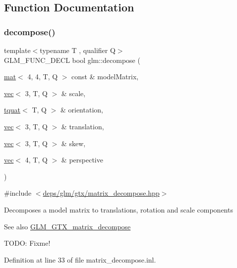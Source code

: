\subsection{Function Documentation}
\mbox{\label{group__gtx__matrix__decompose_ga91185463739c855d602596907a9994bc}} 
\subsubsection{\texorpdfstring{decompose()}{decompose()}}
{\footnotesize\ttfamily template$<$typename T , qualifier Q$>$ \\
G\+L\+M\+\_\+\+F\+U\+N\+C\+\_\+\+D\+E\+CL bool glm\+::decompose (\begin{DoxyParamCaption}\item[{\hyperlink{structglm_1_1mat}{mat}$<$ 4, 4, T, Q $>$ const \&}]{model\+Matrix,  }\item[{\hyperlink{structglm_1_1vec}{vec}$<$ 3, T, Q $>$ \&}]{scale,  }\item[{\hyperlink{structglm_1_1tquat}{tquat}$<$ T, Q $>$ \&}]{orientation,  }\item[{\hyperlink{structglm_1_1vec}{vec}$<$ 3, T, Q $>$ \&}]{translation,  }\item[{\hyperlink{structglm_1_1vec}{vec}$<$ 3, T, Q $>$ \&}]{skew,  }\item[{\hyperlink{structglm_1_1vec}{vec}$<$ 4, T, Q $>$ \&}]{perspective }\end{DoxyParamCaption})}



{\ttfamily \#include $<$\hyperlink{matrix__decompose_8hpp}{deps/glm/gtx/matrix\+\_\+decompose.\+hpp}$>$}

Decomposes a model matrix to translations, rotation and scale components \begin{DoxySeeAlso}{See also}
\hyperlink{group__gtx__matrix__decompose}{G\+L\+M\+\_\+\+G\+T\+X\+\_\+matrix\+\_\+decompose} 
\end{DoxySeeAlso}
T\+O\+DO\+: Fixme! 

Definition at line 33 of file matrix\+\_\+decompose.\+inl.

